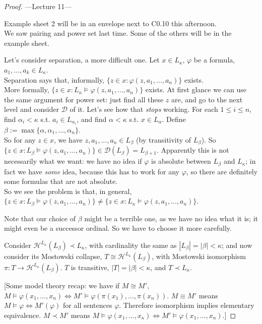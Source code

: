 \documentclass[a4paper]{article}
\begin{document}
\begin{proof}
---Lecture 11---

Example sheet 2 will be in an envelope next to C0.10 this afternoon.\\
We saw pairing and power set last time. Some of the others will be in the example sheet.

Let's consider separation, a more difficult one. Let $x \in L_\kappa$, $\varphi$ be a formula, $a_1,...,a_k \in L_\kappa$.\\
Separation says that, informally, $\{z \in x:\varphi(z,a_1,...,a_n) \}$ exists.\\
More formally, $\{z \in x: L_\kappa \vDash \varphi(z,a_1,...,a_n)\}$ exists. At first glance we can use the same argument for power set: just find all these $z$ are, and go to the next level and consider $\mathcal{D}$ of it. Let's see how that \emph{stops} working. For each $1 \leq i \leq n$, find $\alpha_i < \kappa$ s.t. $a_i  \in L_{\alpha_i}$, and find $\alpha <  \kappa$ s.t. $x \in L_\alpha$. Define $\beta:=\max\{\alpha,\alpha_1,...,\alpha_n\}$.\\
So for any $z \in x$, we have $z,a_1,...,a_n \in L_\beta$ (by transitivity of $L_\beta$). So $\{z \in x: L_\beta \vDash \varphi(z,a_1,...,a_n)\} \in \mathcal{D}(L_\beta) = L_{\beta+1}$. Apparently this is not necessarily what we want: we have no idea if $\varphi$ is absolute between $L_\beta$ and $L_\kappa$; in fact we have \emph{some} idea, because this has to work for any $\varphi$, so there are definitely some formulas that are not absolute.\\
So we see the problem is that, in general, $\{z \in x: L_\beta \vDash \varphi(z,a_1,...,a_n)\} \neq \{z \in x: L_\kappa \vDash \varphi(z,a_1,...,a_n)\}$.

Note that our choice of $\beta$ might be a terrible one, as we have no idea what it is; it might even be a successor ordinal. So we have to choose it more carefully.

Consider $\mathcal{H}^{L_\kappa}(L_\beta) \prec L_\kappa$, with cardinality the same as $|L_\beta| = |\beta| < \kappa$; and now consider its Mostowski collapse, $T \cong \mathcal{H}^{L_\kappa} (L_\beta)$, with Mostowski isomorphism $\pi:T \to \mathcal{H}^{L_\kappa} (L_\beta)$. $T$ is transitive, $|T| = |\beta| < \kappa$, and $T \prec L_\kappa$.

[Some model theory recap: we have if $M \cong M'$, $M\vDash \varphi(x_1,...,x_n) \iff M' \vDash \varphi(\pi(x_1),...,\pi(x_n))$. $M \equiv M'$ means $M\vDash \varphi \iff M'(\varphi)$ for all sentences $\varphi$. Therefore isomorphism implies elementary equivalence. $M\prec M'$ means $M \vDash \varphi(x_1,...,x_\kappa) \iff M' \vDash \varphi(x_1,...,x_n)$.]


\end{proof}
\end{document}
